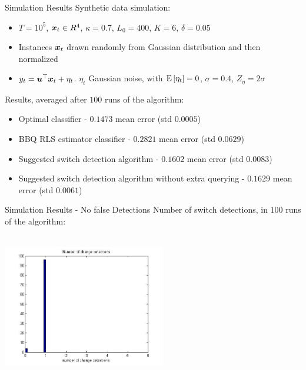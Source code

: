\documentclass{beamer}
\begin{document}
\begin{frame}{Simulation Results}
Synthetic data simulation:
\begin{itemize}
\item $T=10^5$, ${\boldsymbol{x}}_{t}\in R^4$, $\kappa=0.7$, $L_0=400$, $K=6$, $\delta=0.05$
\item Instances ${\boldsymbol{x}}_{t}$ drawn randomly from Gaussian distribution and then normalized
\item $y_t={{\boldsymbol{u}}}^{\top}{\boldsymbol{x}}_{t}+\eta_t$. $\eta_t$ Gaussian noise, with ${\rm E}\left[{\eta_t}\right]=0$, $\sigma=0.4$, $Z_{\eta}=2\sigma$  \newline
\end{itemize}
Results, averaged after $100$ runs of the algorithm:
\begin{itemize}
\item Optimal classifier - $0.1473$ mean error (std $0.0005$)
\item BBQ RLS estimator classifier - $0.2821$ mean error (std $0.0629$)
\item Suggested switch detection algorithm - $0.1602$ mean error (std $0.0083$)
\item Suggested switch detection algorithm without extra querying - $0.1629$ mean error (std $0.0061$)
\end{itemize}

\end{frame}


\begin{frame}{Simulation Results - No false Detections}
Number of switch detections, in $100$ runs of the algorithm:
\begin{center}
\includegraphics[height=2.5in,width=2.8in]{Ndet_reg_alg2.jpg}
\end{center}
\end{frame}
\end{document}
